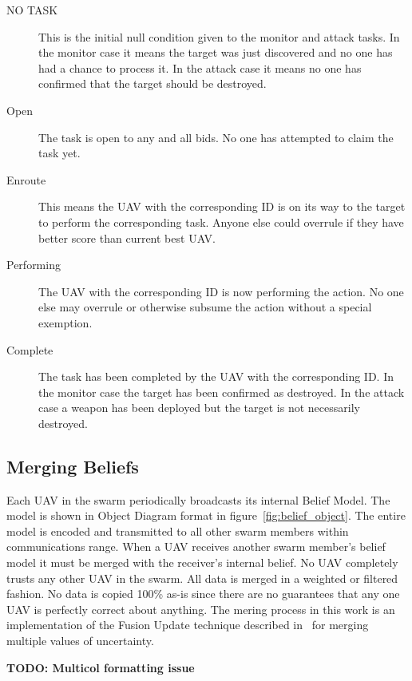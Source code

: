 \begin{multicols*}{2}
\begin{description}
	\item [NO TASK] This is the initial null condition given to the monitor and attack tasks.  In the monitor case it means the target was just discovered and no one has had a chance to process it.  In the attack case it means no one has confirmed that the target should be destroyed.
	\item [Open] The task is open to any and all bids.  No one has attempted to claim the task yet.
	\item [Enroute] This means the UAV with the corresponding ID is on its way to the target to perform the corresponding task.  Anyone else could overrule if they have better score than current best UAV.
	\item [Performing] The UAV with the corresponding ID is now performing the action.  No one else may overrule or otherwise subsume the action without a special exemption.%
	\item [Complete] The task has been completed by the UAV with the corresponding ID.  In the monitor case the target has been confirmed as destroyed.  In the attack case a weapon has been deployed but the target is not necessarily destroyed.
\end{description}

\subsection{Merging Beliefs}
Each UAV in the swarm periodically broadcasts its internal Belief Model.  The model is shown in Object Diagram format in figure~\ref{fig:belief_object}.  The entire model is encoded and transmitted to all other swarm members within communications range.   When a UAV receives another swarm member's belief model it must be merged with the receiver's internal belief.  No UAV completely trusts any other UAV in the swarm.  All data is merged in a weighted or filtered fashion.  No data is copied 100\% as-is since there are no guarantees that any one UAV is perfectly correct about anything.  The mering process in this work is an implementation of the Fusion Update technique described in~\cite{shem} for merging multiple values of uncertainty.

\textbf{TODO: Multicol formatting issue}
\end{multicols*}
